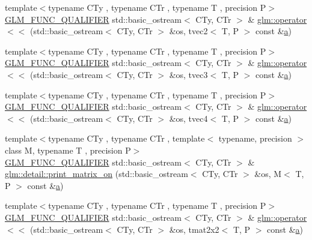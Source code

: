 \begin{DoxyCompactItemize}
\item 
{\footnotesize template$<$typename C\+Ty , typename C\+Tr , typename T , precision P$>$ }\\\mbox{\hyperlink{setup_8hpp_a33fdea6f91c5f834105f7415e2a64407}{G\+L\+M\+\_\+\+F\+U\+N\+C\+\_\+\+Q\+U\+A\+L\+I\+F\+I\+ER}} std\+::basic\+\_\+ostream$<$ C\+Ty, C\+Tr $>$ \& \mbox{\hyperlink{group__gtx__io_ga0a3bca262adbba991f394d8d3d52e10d}{glm\+::operator$<$$<$}} (std\+::basic\+\_\+ostream$<$ C\+Ty, C\+Tr $>$ \&os, tvec2$<$ T, P $>$ const \&\mbox{\hyperlink{glad_8h_ac8729153468b5dcf13f971b21d84d4e5}{a}})
\item 
{\footnotesize template$<$typename C\+Ty , typename C\+Tr , typename T , precision P$>$ }\\\mbox{\hyperlink{setup_8hpp_a33fdea6f91c5f834105f7415e2a64407}{G\+L\+M\+\_\+\+F\+U\+N\+C\+\_\+\+Q\+U\+A\+L\+I\+F\+I\+ER}} std\+::basic\+\_\+ostream$<$ C\+Ty, C\+Tr $>$ \& \mbox{\hyperlink{group__gtx__io_ga0d6cfb5d138639b90f18d7bbb2a4ae56}{glm\+::operator$<$$<$}} (std\+::basic\+\_\+ostream$<$ C\+Ty, C\+Tr $>$ \&os, tvec3$<$ T, P $>$ const \&\mbox{\hyperlink{glad_8h_ac8729153468b5dcf13f971b21d84d4e5}{a}})
\item 
{\footnotesize template$<$typename C\+Ty , typename C\+Tr , typename T , precision P$>$ }\\\mbox{\hyperlink{setup_8hpp_a33fdea6f91c5f834105f7415e2a64407}{G\+L\+M\+\_\+\+F\+U\+N\+C\+\_\+\+Q\+U\+A\+L\+I\+F\+I\+ER}} std\+::basic\+\_\+ostream$<$ C\+Ty, C\+Tr $>$ \& \mbox{\hyperlink{group__gtx__io_ga948ab426a879f24236d8978ee9b5fade}{glm\+::operator$<$$<$}} (std\+::basic\+\_\+ostream$<$ C\+Ty, C\+Tr $>$ \&os, tvec4$<$ T, P $>$ const \&\mbox{\hyperlink{glad_8h_ac8729153468b5dcf13f971b21d84d4e5}{a}})
\item 
{\footnotesize template$<$typename C\+Ty , typename C\+Tr , template$<$ typename, precision $>$ class M, typename T , precision P$>$ }\\\mbox{\hyperlink{setup_8hpp_a33fdea6f91c5f834105f7415e2a64407}{G\+L\+M\+\_\+\+F\+U\+N\+C\+\_\+\+Q\+U\+A\+L\+I\+F\+I\+ER}} std\+::basic\+\_\+ostream$<$ C\+Ty, C\+Tr $>$ \& \mbox{\hyperlink{namespaceglm_1_1detail_a705becbf05df4c8637731f85569fc0e6}{glm\+::detail\+::print\+\_\+matrix\+\_\+on}} (std\+::basic\+\_\+ostream$<$ C\+Ty, C\+Tr $>$ \&os, M$<$ T, P $>$ const \&\mbox{\hyperlink{glad_8h_ac8729153468b5dcf13f971b21d84d4e5}{a}})
\item 
{\footnotesize template$<$typename C\+Ty , typename C\+Tr , typename T , precision P$>$ }\\\mbox{\hyperlink{setup_8hpp_a33fdea6f91c5f834105f7415e2a64407}{G\+L\+M\+\_\+\+F\+U\+N\+C\+\_\+\+Q\+U\+A\+L\+I\+F\+I\+ER}} std\+::basic\+\_\+ostream$<$ C\+Ty, C\+Tr $>$ \& \mbox{\hyperlink{group__gtx__io_ga61fbdb6ad70c4c8d750a847251fa4a4a}{glm\+::operator$<$$<$}} (std\+::basic\+\_\+ostream$<$ C\+Ty, C\+Tr $>$ \&os, tmat2x2$<$ T, P $>$ const \&\mbox{\hyperlink{glad_8h_ac8729153468b5dcf13f971b21d84d4e5}{a}})

\end{DoxyCompactItemize}
